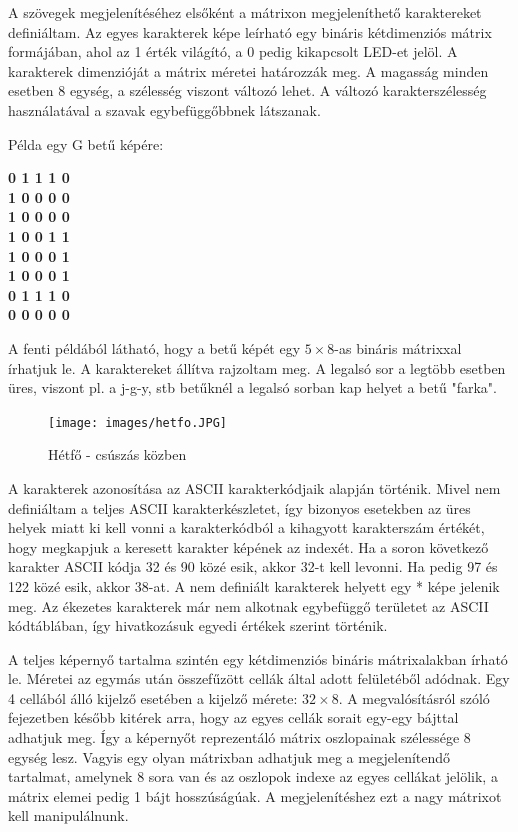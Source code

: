 \documentclass[a4paper, 12pt]{article}
\begin{document}
A szövegek megjelenítéséhez elsőként a mátrixon megjeleníthető karaktereket definiáltam. Az egyes karakterek képe leírható egy bináris kétdimenziós mátrix formájában, ahol az 1 érték világító, a 0 pedig kikapcsolt LED-et jelöl.
A karakterek dimenzióját a mátrix méretei határozzák meg. A magasság minden esetben 8 egység, a szélesség viszont változó lehet. A változó karakterszélesség használatával a szavak egybefüggőbbnek látszanak.

Példa egy G betű képére:
\begin{center}
\textbf{0 1 1 1 0\\
1 0 0 0 0\\
1 0 0 0 0\\
1 0 0 1 1\\
1 0 0 0 1\\
1 0 0 0 1\\
0 1 1 1 0\\
0 0 0 0 0}
\end{center}
A fenti példából látható, hogy a betű képét egy $5\times 8$-as bináris mátrixxal írhatjuk le. A karaktereket állítva rajzoltam meg. A legalsó sor a legtöbb esetben üres, viszont pl. a j-g-y, stb betűknél a legalsó sorban kap helyet a betű "farka".

\begin{figure}[ht]
	\centering
	\texttt{[image: images/hetfo.JPG]}
	\caption{Hétfő - csúszás közben}
	\label{fig:hetfo}
\end{figure}	

A karakterek azonosítása az ASCII karakterkódjaik alapján történik. Mivel nem definiáltam a teljes ASCII karakterkészletet, így bizonyos esetekben az üres helyek miatt ki kell vonni a karakterkódból a kihagyott karakterszám értékét, hogy megkapjuk a keresett karakter képének az indexét.
Ha a soron következő karakter ASCII kódja 32 és 90 közé esik, akkor 32-t kell levonni. Ha pedig 97 és 122 közé esik, akkor 38-at. A nem definiált karakterek helyett egy * képe jelenik meg.
Az ékezetes karakterek már nem alkotnak egybefüggő területet az ASCII kódtáblában, így hivatkozásuk egyedi értékek szerint történik.

A teljes képernyő tartalma szintén egy kétdimenziós bináris mátrixalakban írható le. Méretei az egymás után összefűzött cellák által adott felületéből adódnak. Egy 4 cellából álló kijelző esetében a kijelző mérete: $32\times 8$.
A megvalósításról szóló fejezetben később kitérek arra, hogy az egyes cellák sorait egy-egy bájttal adhatjuk meg. Így a képernyőt reprezentáló mátrix oszlopainak szélessége 8 egység lesz. Vagyis egy olyan mátrixban adhatjuk meg a megjelenítendő tartalmat, amelynek 8 sora van és az oszlopok indexe az egyes cellákat jelölik, a mátrix elemei pedig 1 bájt hosszúságúak.
A megjelenítéshez ezt a nagy mátrixot kell manipulálnunk.
\end{document}
